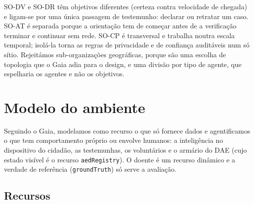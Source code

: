 \documentclass[10pt,a4paper]{article}
\newcommand{\id}[1]{\texttt{#1}}
\begin{document}
SO-DV e SO-DR têm objetivos diferentes (certeza contra velocidade de chegada) e ligam-se por uma única passagem de testemunho: declarar ou retratar um caso. SO-AT é separada porque a orientação tem de começar antes de a verificação terminar e continuar sem rede. SO-CP é transversal e trabalha noutra escala temporal; isolá-la torna as regras de privacidade e de confiança auditáveis num só sítio. Rejeitámos sub-organizações geográficas, porque são uma escolha de topologia que o Gaia adia para o design, e uma divisão por tipo de agente, que espelharia os agentes e não os objetivos.

\section{Modelo do ambiente}\label{sec:ambiente}

Seguindo o Gaia, modelamos como recurso o que só fornece dados e agentificamos o que tem comportamento próprio ou envolve humanos: a inteligência no dispositivo do cidadão, as testemunhas, os voluntários e o armário do DAE (cujo estado visível é o recurso \id{aedRegistry}). O doente é um recurso dinâmico e a verdade de referência (\id{groundTruth}) só serve a avaliação.

\subsection{Recursos}\label{sec:recursos}
\end{document}
